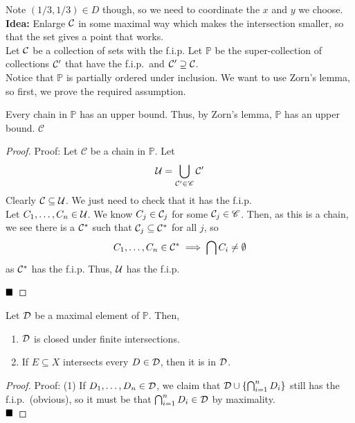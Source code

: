 Note $(1/3, 1/3) \in D$ though, so we need to coordinate the $x$ and $y$ we choose.\\

\textbf{Idea:} Enlarge $\cal{C}$ in some maximal way which makes the intersection smaller, so that the set gives a point that works.\\

Let $\cal{C}$ be a collection of sets with the f.i.p. Let $\mathbb{P}$ be the super-collection of collections $\cal{C}'$ that have the f.i.p.\ and $\cal{C}' \supseteq \cal{C}$.\\

Notice that $\mathbb{P}$ is partially ordered under inclusion. We want to use Zorn's lemma, so first, we prove the required assumption.

\begin{lemma}
    Every chain in $\mathbb{P}$ has an upper bound. Thus, by Zorn's lemma, $\mathbb{P}$ has an upper bound. $\mathscr{C}$
\end{lemma}
\begin{proof}{Proof:}
    Let $\mathscr{C}$ be a chain in $\mathbb{P}$. Let
    \[ \cal{U} = \bigcup_{\cal{C}' \in \mathscr{C}} \cal{C}' \]
    Clearly $\cal{C} \subseteq \cal{U}$. We just need to check that it has the f.i.p.\\

    Let $C_1, \ldots, C_n \in \cal{U}$. We know $C_j \in \cal{C}_j$ for some $\cal{C}_j \in \mathscr{C}$. Then, as this is a chain, we see there is a $\cal{C}^{*}$ such that $\cal{C}_j \subseteq \cal{C}^{*}$ for all $j$, so
    \[ C_1, \ldots, C_n \in \cal{C}^{*} \implies \bigcap C_i \neq \emptyset \]
    as $\cal{C}^{*}$ has the f.i.p. Thus, $\cal{U}$ has the f.i.p.

    $\qed$
\end{proof}

\begin{lemma}
    Let $\cal{D}$ be a maximal element of $\mathbb{P}$. Then,
    \begin{enumerate}[label = (\arabic*)]
        \item $\cal{D}$ is closed under finite intersections.
        \item If $E \subseteq X$ intersects every $D \in \cal{D}$, then it is in $\cal{D}$.
    \end{enumerate}
\end{lemma}
\begin{proof}{Proof:}
    (1) If $D_1, \ldots, D_n \in \cal{D}$, we claim that $\cal{D} \cup \{\bigcap_{i = 1}^{n} D_i\}$ still has the f.i.p.\ (obvious), so it must be that $\bigcap_{i = 1}^{n} D_i \in \cal{D}$ by maximality.\\

    $\qed$
\end{proof}
